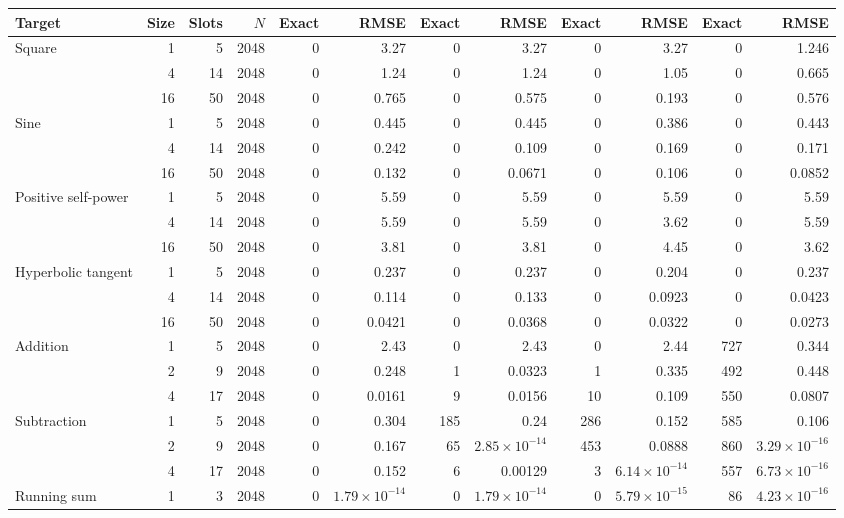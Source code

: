 \begin{table}[htbp]
\begin{tabular*}{\linewidth}{@{\extracolsep{\fill}}lrrr *{4}{rr}@{}}
\cmidrule(lr){5-6}\cmidrule(lr){7-8}\cmidrule(lr){9-10}\cmidrule(l){11-12}
Target & Size & Slots & $N$ & Exact & RMSE & Exact & RMSE & Exact & RMSE & Exact & RMSE \\
\midrule
Square & 1 & 5 & 2048 & 0 & 3.27 & 0 & 3.27 & 0 & 3.27 & 0 & 1.246 \\
 & 4 & 14 & 2048 & 0 & 1.24 & 0 & 1.24 & 0 & 1.05 & 0 & 0.665 \\
 & 16 & 50 & 2048 & 0 & 0.765 & 0 & 0.575 & 0 & 0.193 & 0 & 0.576 \\
\addlinespace[0.7pt]
Sine & 1 & 5 & 2048 & 0 & 0.445 & 0 & 0.445 & 0 & 0.386 & 0 & 0.443 \\
 & 4 & 14 & 2048 & 0 & 0.242 & 0 & 0.109 & 0 & 0.169 & 0 & 0.171 \\
 & 16 & 50 & 2048 & 0 & 0.132 & 0 & 0.0671 & 0 & 0.106 & 0 & 0.0852 \\
\addlinespace[0.7pt]
Positive self-power & 1 & 5 & 2048 & 0 & 5.59 & 0 & 5.59 & 0 & 5.59 & 0 & 5.59 \\
 & 4 & 14 & 2048 & 0 & 5.59 & 0 & 5.59 & 0 & 3.62 & 0 & 5.59 \\
 & 16 & 50 & 2048 & 0 & 3.81 & 0 & 3.81 & 0 & 4.45 & 0 & 3.62 \\
\addlinespace[0.7pt]
Hyperbolic tangent & 1 & 5 & 2048 & 0 & 0.237 & 0 & 0.237 & 0 & 0.204 & 0 & 0.237 \\
 & 4 & 14 & 2048 & 0 & 0.114 & 0 & 0.133 & 0 & 0.0923 & 0 & 0.0423 \\
 & 16 & 50 & 2048 & 0 & 0.0421 & 0 & 0.0368 & 0 & 0.0322 & 0 & 0.0273 \\
\addlinespace[0.7pt]
Addition & 1 & 5 & 2048 & 0 & 2.43 & 0 & 2.43 & 0 & 2.44 & 727 & 0.344 \\
 & 2 & 9 & 2048 & 0 & 0.248 & 1 & 0.0323 & 1 & 0.335 & 492 & 0.448 \\
 & 4 & 17 & 2048 & 0 & 0.0161 & 9 & 0.0156 & 10 & 0.109 & 550 & 0.0807 \\
\addlinespace[0.7pt]
Subtraction & 1 & 5 & 2048 & 0 & 0.304 & 185 & 0.24 & 286 & 0.152 & 585 & 0.106 \\
 & 2 & 9 & 2048 & 0 & 0.167 & 65 & $2.85\!\times\!10^{-14}$ & 453 & 0.0888 & 860 & $3.29\!\times\!10^{-16}$ \\
 & 4 & 17 & 2048 & 0 & 0.152 & 6 & 0.00129 & 3 & $6.14\!\times\!10^{-14}$ & 557 & $6.73\!\times\!10^{-16}$ \\
\addlinespace[0.7pt]
Running sum & 1 & 3 & 2048 & 0 & $1.79\!\times\!10^{-14}$ & 0 & $1.79\!\times\!10^{-14}$ & 0 & $5.79\!\times\!10^{-15}$ & 86 & $4.23\!\times\!10^{-16}$ \\

\end{tabular*}
\end{table}
